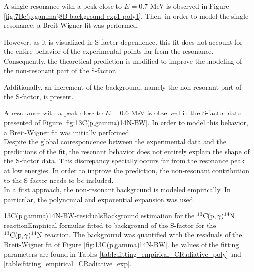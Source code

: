 \documentclass[openany]{book}
\begin{document}
A single resonance with a peak close to $E$ = 0.7 MeV is observed in Figure \ref{fig:7Be(p,gamma)8B-background-exp1-poly1}. Then, in order to model the single resonance, a Breit-Wigner fit was performed.


However, as it is visualized in S-factor dependence, this fit does not account for the entire behavior of the experimental points far from the resonance. Consequently, the theoretical prediction is modified to improve the modeling of the non-resonant part of the S-factor.

Additionally, an increment of the background, namely the non-resonant part of the S-factor, is present.



A resonance with a peak close to $E$ = 0.6 MeV is observed in the S-factor data presented of Figure \ref{fig:13C(p,gamma)14N-BW}. In order to model this behavior, a Breit-Wigner fit was initially performed.  \\


Despite the global correspondence between the experimental data and the predictions of the fit, the resonant behavior does not entirely explain the shape of the S-factor data. This discrepancy specially  occurs far from the resonance peak at low energies. In order to improve the prediction, the non-resonant contribution to the S-factor needs to be included. \\

In a first approach, the non-resonant background is modeled empirically. In particular, the polynomial and exponential expansion was used.

{13C(p,gamma)14N-BW-residuals}{Background estimation for the $\mathrm{{}^{13}C(p, \gamma){}^{14}N}$ reaction}{Empirical formulas fitted to background of the S-factor for the $\mathrm{{}^{13}C(p, \gamma){}^{14}N}$ reaction. The background was quantified with the residuals of the Breit-Wigner fit of Figure \ref{fig:13C(p,gamma)14N-BW}. he values of the fitting parameters are found in Tables \ref{table:fitting_empirical_CRadiative_poly} and \ref{table:fitting_empirical_CRadiative_exp}.}
\end{document}
